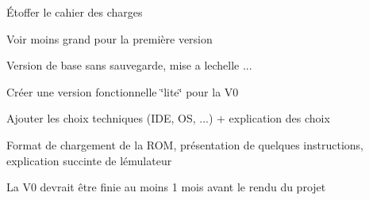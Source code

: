 
\begin{DoxyItemize}
\item Étoffer le cahier des charges
\item Voir moins grand pour la première version
\item Version de base sans sauvegarde, mise a l\textquotesingle{}echelle ...
\item Créer une version fonctionnelle \char`\"{}lite\char`\"{} pour la V0
\item Ajouter les choix techniques (I\+DE, OS, ...) + explication des choix
\item Format de chargement de la R\+OM, présentation de quelques instructions, explication succinte de l\textquotesingle{}émulateur
\item La V0 devrait être finie au moins 1 mois avant le rendu du projet 
\end{DoxyItemize}